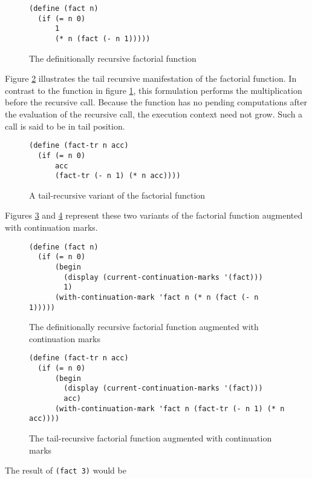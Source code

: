\documentclass[ms]{byuprop}
\newcounter{definition}
\begin{document}
\begin{figure}
\begin{verbatim}
(define (fact n)
  (if (= n 0)
      1
      (* n (fact (- n 1)))))
\end{verbatim}
\caption{The definitionally recursive factorial function}
\label{fac-rec}
\end{figure}

Figure \ref{fac-tail-rec} illustrates the tail recursive manifestation of the factorial
function. In contrast to the function in figure \ref{fac-rec}, this formulation performs
the multiplication before the recursive call. Because the function has no pending
computations after the evaluation of the recursive call, the execution context need not
grow. Such a call is said to be in tail position.

\begin{figure}
\begin{verbatim}
(define (fact-tr n acc)
  (if (= n 0)
      acc
      (fact-tr (- n 1) (* n acc))))
\end{verbatim}
\caption{A tail-recursive variant of the factorial function}
\label{fac-tail-rec}
\end{figure}

Figures \ref{fac-rec-cm} and \ref{fac-tail-rec-cm} represent these two variants of the
factorial function augmented with continuation marks.


\begin{figure}
\begin{verbatim}
(define (fact n)
  (if (= n 0)
      (begin
        (display (current-continuation-marks '(fact)))
        1)
      (with-continuation-mark 'fact n (* n (fact (- n 1)))))
\end{verbatim}
\caption{The definitionally recursive factorial function augmented with continuation marks}
\label{fac-rec-cm}
\end{figure}

\begin{figure}
\begin{verbatim}
(define (fact-tr n acc)
  (if (= n 0)
      (begin
        (display (current-continuation-marks '(fact)))
        acc)
      (with-continuation-mark 'fact n (fact-tr (- n 1) (* n acc))))
\end{verbatim}
\caption{The tail-recursive factorial function augmented with continuation marks}
\label{fac-tail-rec-cm}
\end{figure}

The result of \texttt{(fact 3)} would be
\end{document}
